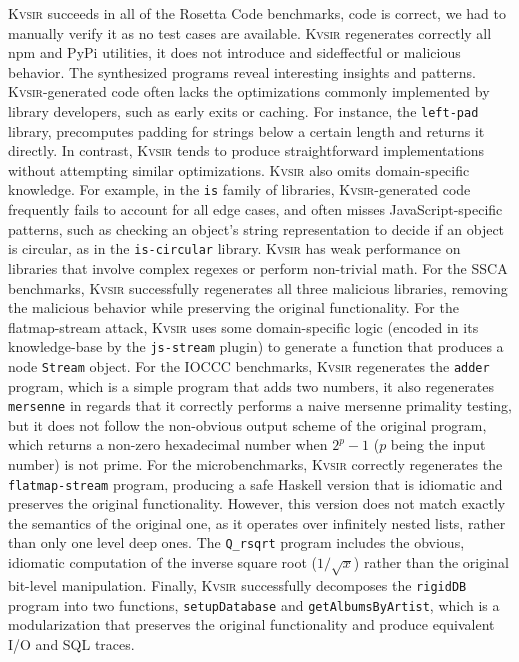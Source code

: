 \documentclass[noacm,sigplan,review]{acmart}
\newcommand{\sys}{{\scshape Kv{\textalpha}sir}\xspace}
\newcommand{\ttt}[1]{\texttt{#1}\xspace}
\begin{document}
\sys succeeds in all of the Rosetta Code benchmarks, code is correct, we had to manually verify it as no test cases are available.
\sys regenerates correctly all npm and PyPi utilities, it does not introduce and sideffectful or malicious behavior.
The synthesized programs reveal interesting insights and patterns.
\sys-generated code often lacks the optimizations commonly
implemented by library developers, such as early exits or caching.
For instance, the \texttt{left-pad} library, precomputes padding for strings below a certain length
and returns it directly. In contrast, \sys tends to produce straightforward
implementations without attempting similar optimizations.
\sys also omits domain-specific knowledge.
For example, in the \texttt{is} family of libraries,
\sys-generated code frequently fails to account for all edge cases,
and often misses JavaScript-specific patterns,
such as checking an object’s string representation to decide if an object is circular, as in the \texttt{is-circular} library.
\sys has weak performance on libraries that involve complex regexes or perform non-trivial math.
For the SSCA benchmarks, \sys successfully regenerates all three malicious libraries, removing the malicious behavior while preserving the original functionality.
For the flatmap-stream attack, \sys uses some domain-specific logic (encoded in its knowledge-base by the \ttt{js-stream} plugin) to generate a function that produces a node \ttt{Stream} object.
For the IOCCC benchmarks, \sys regenerates the \ttt{adder} program, which is a simple program that adds two numbers,
it also regenerates \ttt{mersenne} in regards that it correctly performs a naive mersenne primality testing, but it does not follow the non-obvious output scheme of the original program, which returns a non-zero hexadecimal number when $2^p - 1$ ($p$ being the input number) is not prime.
For the microbenchmarks, \sys correctly regenerates the \ttt{flatmap-stream} program, producing a safe Haskell version that is idiomatic and preserves the original functionality.
However, this version does not match exactly the semantics of the original one, as it operates over infinitely nested lists, rather than only one level deep ones.
The \ttt{Q\_rsqrt} program includes the obvious, idiomatic computation of the inverse square root ($1/\sqrt{x}$) rather than the original bit-level manipulation.
Finally, \sys successfully decomposes the \ttt{rigidDB} program into two
functions, \ttt{setupDatabase} and \ttt{getAlbumsByArtist}, which is a
modularization that preserves the original functionality and produce equivalent I/O and SQL traces.
\end{document}
